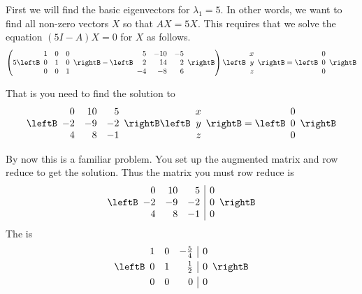 \begin{solution}
First we will find the basic eigenvectors for $\lambda_1 =5.$ In other
words, we want to find all non-zero vectors $X$ so that $AX =
5X$. This requires that we solve the equation $\left( 5 I - A 
\right) X = 0$ for $X$ as follows.
\begin{equation*}
\left( 5\leftB
\begin{array}{rrr}
1 & 0 & 0 \\
0 & 1 & 0 \\
0 & 0 & 1
\end{array}
\rightB -  \leftB 
\begin{array}{rrr}
5 & -10 & -5 \\
2 & 14 & 2 \\
-4 & -8 & 6
\end{array}
\rightB  \right) \leftB
\begin{array}{r}
x \\
y \\
z
\end{array}
\rightB =\leftB
\begin{array}{r}
0 \\
0 \\
0
\end{array}
\rightB 
\end{equation*}

That is you need to find the solution to
\begin{equation*}
\allowbreak \leftB
\begin{array}{rrr}
0 & 10 & 5 \\
-2 & -9 & -2 \\
4 & 8 & -1
\end{array}
\rightB \leftB
\begin{array}{r}
x \\
y \\
z
\end{array}
\rightB =\leftB
\begin{array}{r}
0 \\
0 \\
0
\end{array}
\rightB
\end{equation*}

By now this is a familiar problem. You set up the augmented matrix and row
reduce to get the solution. Thus the matrix you must row reduce is
\begin{equation*}
\leftB
\begin{array}{rrr|r}
 0 & 10 & 5 & 0 \\
 -2 &  -9  &  -2 & 0 \\
4 & 8  &  -1 & 0
\end{array}
\rightB  
\end{equation*}
The \rref \;is
\begin{equation*}
\leftB
\begin{array}{rrr|r}
1 & 0 & -
\vspace{0.05in}\frac{5}{4} & 0 \\
0 & 1 & \vspace{0.05in}\frac{1}{2} & 0 \\
0 & 0 & 0 & 0
\end{array}
\rightB
\end{equation*}


\end{solution}
